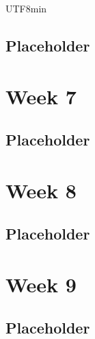 \documentclass[11pt]{article}
\begin{document}
\begin{CJK}{UTF8}{min}
\subsection{Placeholder}


\newpage
\section{Week 7}

\subsection{Placeholder}


\newpage
\section{Week 8}

\subsection{Placeholder}


\newpage
\section{Week 9}

\subsection{Placeholder}



\end{CJK}
\end{document}
